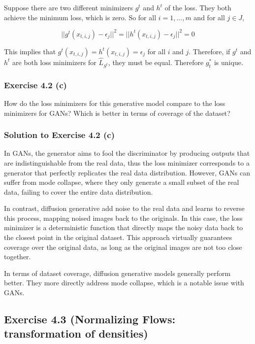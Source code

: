 \documentclass[
10pt, %
a4paper, %
oneside, %
headinclude,footinclude, %
BCOR5mm, %
]{scrartcl}
\begin{document}
Suppose there are two different minimizers $g^t$ and $h^t$ of the loss. They both achieve the minimum loss, which is zero. So for all $i = 1, ..., m$ and for all $j \in J$,

\begin{equation*}
  ||g^t(x_{t,i,j}) - \epsilon_j||^2 = ||h^t(x_{t,i,j}) - \epsilon_j||^2 = 0
\end{equation*}

This implies that $g^t(x_{t,i,j}) = h^t(x_{t,i,j}) = \epsilon_j$ for all $i$ and $j$. Therefore, if $g^t$ and $h^t$ are both loss minimizers for $\hat{L}_{S^t}$, they must be equal. Therefore $g^*_t$ is unique.

\subsubsection*{Exercise 4.2 (c)}
How do the loss minimizers for this generative model compare to the loss minimizers for GANs? Which is better in terms of coverage of the dataset?

\subsubsection*{Solution to Exercise 4.2 (c)}

In GANs, the generator aims to fool the discriminator by producing outputs that are indistinguishable from the real data, thus the loss minimizer corresponds to a generator that perfectly replicates the real data distribution. However, GANs can suffer from mode collapse, where they only generate a small subset of the real data, failing to cover the entire data distribution.

In contrast, diffusion generative add noise to the real data and learns to reverse this process, mapping noised images back to the originals. In this case, the loss minimizer is a deterministic function that directly maps the noisy data back to the closest point in the original dataset. This approach virtually guarantees coverage over the original data, as long as the original images are not too close together.

In terms of dataset coverage, diffusion generative models generally perform better. They more directly address mode collapse, which is a notable issue with GANs.

\newpage

\subsection*{Exercise 4.3 (Normalizing Flows: transformation of densities)}
\end{document}
